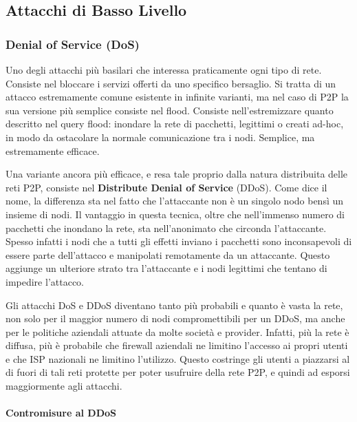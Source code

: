 \subsection{Attacchi di Basso Livello}\label{attacchi-di-basso-livello}

\subsubsection{Denial of Service (DoS)}\label{denial-of-service-dos}

Uno degli attacchi più basilari che interessa praticamente ogni tipo di rete. Consiste nel bloccare i servizi offerti da uno specifico bersaglio. Si tratta di un attacco estremamente comune esistente in infinite varianti, ma nel caso di P2P la sua versione più semplice consiste nel flood. Consiste nell'estremizzare quanto descritto nel query flood: inondare la rete di pacchetti, legittimi o creati ad-hoc, in modo da ostacolare la normale comunicazione tra i nodi. Semplice, ma estremamente efficace.

Una variante ancora più efficace, e resa tale proprio dalla natura distribuita delle reti P2P, consiste nel \textbf{Distribute Denial of Service} (DDoS). Come dice il nome, la differenza sta nel fatto che l'attaccante non è un singolo nodo bensì un insieme di nodi. Il vantaggio in questa tecnica, oltre che nell'immenso numero di pacchetti che inondano la rete, sta nell'anonimato che circonda l'attaccante. Spesso infatti i nodi che a tutti gli effetti inviano i pacchetti sono inconsapevoli di essere parte dell'attacco e manipolati remotamente da un attaccante. Questo aggiunge un ulteriore strato tra l'attaccante e i nodi legittimi che tentano di impedire l'attacco.

Gli attacchi DoS e DDoS diventano tanto più probabili e quanto è vasta la rete, non solo per il maggior numero di nodi compromettibili per un DDoS, ma anche per le politiche aziendali attuate da molte società e provider. Infatti, più la rete è diffusa, più è probabile che firewall aziendali ne limitino l'accesso ai propri utenti e che ISP nazionali ne limitino l'utilizzo. Questo costringe gli utenti a piazzarsi al di fuori di tali reti protette per poter usufruire della rete P2P, e quindi ad esporsi maggiormente agli attacchi.

\paragraph{Contromisure al DDoS}\label{contromisure-al-ddos}

